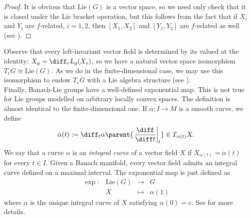  \begin{proof}
    It is obvious that \(\mathrm{Lie}(G)\) is a vector space, so we need only check that it is closed under the Lie bracket operation, but this follows from the fact that if \(X_i\) and \(Y_i\) are \(f\)-related, \(i=1,2\), then \([X_1, X_2]\) and \([Y_1, Y_2]\) are \(f\)-related as well (see \parencite[Page 117]{SergeLang}).
 \end{proof}

 Observe that every left-invariant vector field is determined by its valued at the identity: \(X_{g}=\diff_e L_g(X_e)\), so we have a natural vector space isomorphism \(T_eG \cong \mathrm{Lie}(G)\). As we do in the finite-dimensional case, we may use this isomorphism to endow \(T_eG\) with a Lie algebra structure (see \parencite[Sec. 1.1.2]{Schmeding_2022}). \\

 Finally, Banach-Lie groups have a well-defined exponential map. This is not true for Lie groups modelled on arbitrary locally convex spaces. The definition is almost identical to the finite-dimensional one. If \(\alpha\colon I \to M\) is a smooth curve, we define 
 \begin{equation} \label{def_derivative_curve_Banach_manifold}
 \dot{\alpha}(t):=\diff_t\alpha\parent{\left. \frac{\diff}{\diff t} \right|_{t}} \in T_{\alpha(t)}X.
 \end{equation}
 We say that a curve \(\alpha\) is an \textit{integral curve} of a vector field \(X\) if \(X_{\alpha(t)}=\dot{\alpha}(t)\) for every \(t \in I\). Given a Banach manifold, every vector field admits an integral curve defined on a maximal interval. The exponential map is just defined as
 \[
 \begin{array}{cccc}
    \exp \colon & \mathrm{Lie}(G) & \longrightarrow & G \\
    & X & \mapsto & \alpha(1)
 \end{array}
 \]
 where \(\alpha\) is the unique integral curve of \(X\) satisfying \(\alpha(0)=e\). See \parencite{Dodson_Galanis_Vassiliou_2015} for more details.

